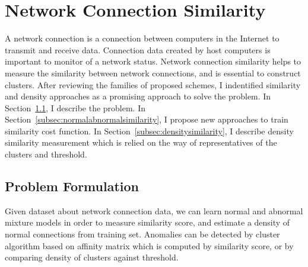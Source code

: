 \section{Network Connection Similarity}
\label{sec:connectionsimilarity}
A network connection is a connection between computers in the Internet to transmit and receive data. 
Connection data created by host computers is important to monitor of a network status.
Network connection similarity helps to measure the similarity between network connections, and is essential to construct clusters. 
After reviewing the families of proposed schemes, I indentified similarity and density approaches as a promising approach to solve the problem.
\newline
In Section~\ref{subsec:problemformulation}, I describe the problem.\newline
In Section~\ref{subsec:normalabnormalsimilarity}, I propose new approaches to train similarity cost function.\newline
In Section~\ref{subsec:densitysimilarity}, I describe density similarity measurement which is relied on the way of representatives of the clusters and threshold.\newline
\subsection{Problem Formulation}
\label{subsec:problemformulation}
Given dataset about network connection data, we can learn normal and abnormal mixture models in order to measure similarity score, and estimate a density of normal connections from training set.
Anomalies can be detected by cluster algorithm based on affinity matrix which is computed by similarity score, or by comparing density of clusters against threshold.

